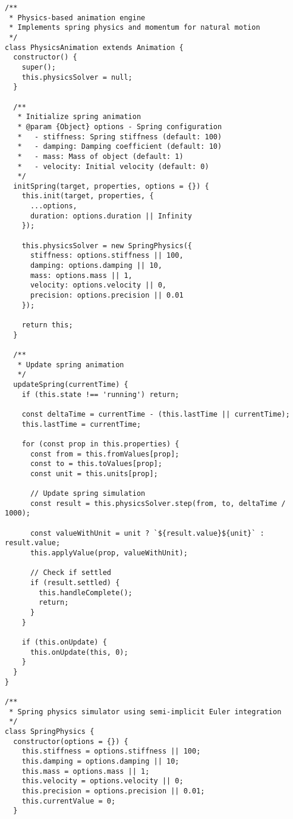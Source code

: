 \documentclass[11pt]{article}
\begin{document}
\begin{verbatim}
/**
 * Physics-based animation engine
 * Implements spring physics and momentum for natural motion
 */
class PhysicsAnimation extends Animation {
  constructor() {
    super();
    this.physicsSolver = null;
  }
  
  /**
   * Initialize spring animation
   * @param {Object} options - Spring configuration
   *   - stiffness: Spring stiffness (default: 100)
   *   - damping: Damping coefficient (default: 10)
   *   - mass: Mass of object (default: 1)
   *   - velocity: Initial velocity (default: 0)
   */
  initSpring(target, properties, options = {}) {
    this.init(target, properties, {
      ...options,
      duration: options.duration || Infinity
    });
    
    this.physicsSolver = new SpringPhysics({
      stiffness: options.stiffness || 100,
      damping: options.damping || 10,
      mass: options.mass || 1,
      velocity: options.velocity || 0,
      precision: options.precision || 0.01
    });
    
    return this;
  }
  
  /**
   * Update spring animation
   */
  updateSpring(currentTime) {
    if (this.state !== 'running') return;
    
    const deltaTime = currentTime - (this.lastTime || currentTime);
    this.lastTime = currentTime;
    
    for (const prop in this.properties) {
      const from = this.fromValues[prop];
      const to = this.toValues[prop];
      const unit = this.units[prop];
      
      // Update spring simulation
      const result = this.physicsSolver.step(from, to, deltaTime / 1000);
      
      const valueWithUnit = unit ? `${result.value}${unit}` : result.value;
      this.applyValue(prop, valueWithUnit);
      
      // Check if settled
      if (result.settled) {
        this.handleComplete();
        return;
      }
    }
    
    if (this.onUpdate) {
      this.onUpdate(this, 0);
    }
  }
}

/**
 * Spring physics simulator using semi-implicit Euler integration
 */
class SpringPhysics {
  constructor(options = {}) {
    this.stiffness = options.stiffness || 100;
    this.damping = options.damping || 10;
    this.mass = options.mass || 1;
    this.velocity = options.velocity || 0;
    this.precision = options.precision || 0.01;
    this.currentValue = 0;
  }
  

\end{verbatim}
\end{document}
